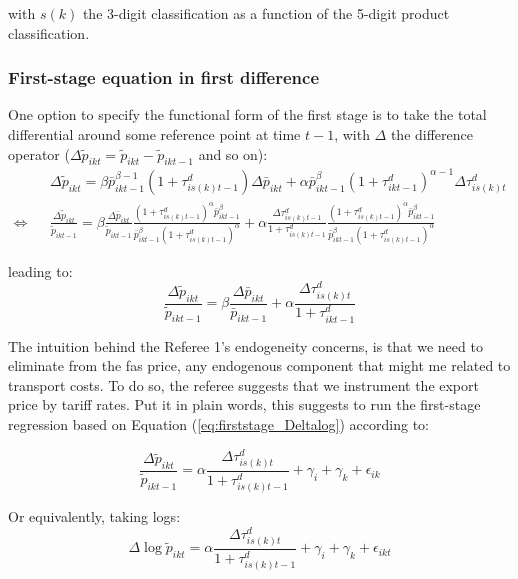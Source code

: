 \documentclass[11pt,twoside, authoryear]{elsarticle}
\begin{document}
\noindent with $s(k)$ the 3-digit classification as a function of the 5-digit product classification.

\subsubsection{First-stage equation in first difference \label{ssec:first_diff}}

One option to specify the functional form of the first stage is to take the total differential around some reference point at time $t-1$, with $\Delta $ the difference operator ($\Delta\widetilde{p}_{ikt} = \widetilde{p}_{ikt} - \widetilde{p}_{ikt-1}$ and so on):
\begin{eqnarray*}
&&\Delta \widetilde{p}_{ikt} = \beta \bar{p}_{ikt-1}^{\beta-1}(1+\tau^d_{is(k)t-1})\Delta \bar{p}_{ikt} + \alpha \bar{p}^\beta_{ikt-1} (1+\tau^d_{ikt-1})^{\alpha-1}\Delta \tau^d_{is(k)t}  \\
\Leftrightarrow &&\frac{\Delta \widetilde{p}_{ikt}}{\widetilde{p}_{ikt-1}} = \beta \frac{\Delta \bar{p}_{ikt}}{\widetilde{p}_{ikt-1}} \frac{(1+\tau^d_{is(k)t-1})^\alpha \bar{p}_{ikt-1}^\beta}{\bar{p}^\beta_{ikt-1}(1+\tau^d_{is(k)t-1})^\alpha} +\alpha \frac{\Delta \tau^d_{is(k)t-1}}{1+\tau_{is(k)t-1}^d}\frac{(1+\tau^d_{is(k)t-1})^\alpha \bar{p}_{ikt-1}^\beta}{\bar{p}^\beta_{ikt-1}(1+\tau^d_{is(k)t-1})^\alpha} \end{eqnarray*}

leading to:
\begin{equation}
\frac{\Delta \widetilde{p}_{ikt}}{\widetilde{p}_{ikt-1}} =  \beta \frac{\Delta \bar{p}_{ikt}}{\bar{p}_{ikt-1}} +\alpha\frac{\Delta \tau^d_{is(k)t}}{1+\tau_{ikt-1}^d} \label{eq:firststage_Deltalog}
\end{equation}

The intuition behind the Referee 1's endogeneity concerns, is that we need to eliminate from the fas price, any endogenous component that might me related to transport costs. To do so, the referee suggests that we instrument the export price by tariff rates. Put it in plain words, this suggests to run the first-stage regression based on Equation (\ref{eq:firststage_Deltalog}) according to:

$$\frac{\Delta \widetilde{p}_{ikt}}{\widetilde{p}_{ikt-1}} = \alpha \frac{\Delta \tau^d_{is(k)t}}{1+\tau_{is(k)t-1}^d} + \gamma_{i} +\gamma_{k}+\epsilon_{ik}$$

Or equivalently, taking logs:
$$\Delta \log \widetilde{p}_{ikt}= \alpha\frac{\Delta \tau^d_{is(k)t}}{1+\tau_{is(k)t-1}^d} +\gamma_{i} +\gamma_{k}+\epsilon_{ikt}$$
\end{document}
